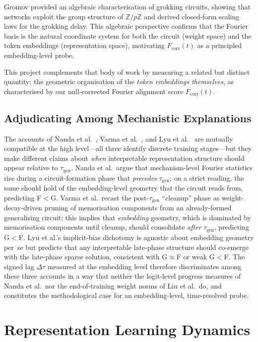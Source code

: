 \documentclass[12pt,openany,a4paper]{book}
\newcommand{\taug}{\tau_{\mathrm{gen}}}
\newcommand{\Dtau}{\Delta\tau}
\newcommand{\fcorr}{F_{\mathrm{corr}}}
\begin{document}
Gromov \cite{gromov2023grokking} provided an algebraic characterisation
of grokking circuits, showing that networks exploit the group structure
of $\mathbb{Z}/p\mathbb{Z}$ and derived closed-form scaling laws for
the grokking delay.
This algebraic perspective confirms that the Fourier basis is the
natural coordinate system for both the circuit (weight space) and
the token embeddings (representation space), motivating $\fcorr(t)$
as a principled embedding-level probe.

This project complements that body of work by measuring a
related but distinct quantity: the geometric organisation of the
\emph{token embeddings themselves}, as characterised by our
null-corrected Fourier alignment score $\fcorr(t)$.

\subsection{Adjudicating Among Mechanistic Explanations}
\label{sec:adjudicate}

The accounts of Nanda et al.\ \cite{nanda2023progress},
Varma et al.\ \cite{varma2023explaining}, and
Lyu et al.\ \cite{lyu2024dichotomy} are mutually compatible at the
high level---all three identify discrete training stages---but they
make different claims about \emph{when} interpretable representation
structure should appear relative to $\taug$.
Nanda et al.\ argue that mechanism-level Fourier statistics rise
during a circuit-formation phase that \emph{precedes} $\taug$;
on a strict reading, the same should hold of the embedding-level
geometry that the circuit reads from, predicting F$<$G.
Varma et al.\ recast the post-$\taug$ ``cleanup'' phase as
weight-decay-driven pruning of memorisation components from an
already-formed generalising circuit; this implies that
\emph{embedding} geometry, which is dominated by memorisation
components until cleanup, should consolidate \emph{after} $\taug$,
predicting G$<$F.
Lyu et al.'s implicit-bias dichotomy is agnostic about embedding
geometry per~se but predicts that any interpretable late-phase
structure should co-emerge with the late-phase sparse solution,
consistent with G$\approx$F or weak G$<$F.
The signed lag $\Dtau$ measured at the embedding level therefore
discriminates among these three accounts in a way that neither the
logit-level progress measures of Nanda et al.\ nor the
end-of-training weight norms of Liu et al.\ do, and constitutes
the methodological case for an embedding-level, time-resolved probe.

\section{Representation Learning Dynamics}
\end{document}
